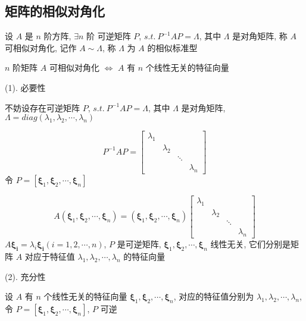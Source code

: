 \subsection{矩阵的相似对角化}

\begin{definition}[相似对角化]
	设 $A$ 是 $n$ 阶方阵, $\exists n$ 阶 可逆矩阵 $P$, $s.t.\ P^{-1}AP = \varLambda$, 其中 $\varLambda$ 是对角矩阵, 称 $A$ 可相似对角化,
	记作 $A\sim \varLambda$, 称 $\varLambda$ 为 $A$ 的相似标准型
\end{definition}

\begin{theorem}[相似对角化充要条件]
	$n$ 阶矩阵 $A$ 可相似对角化 $\Leftrightarrow$ $A$ 有 $n$ 个线性无关的特征向量

	(1). 必要性
	
	不妨设存在可逆矩阵 $P$, $s.t.\ P^{-1}AP=\varLambda$, 其中 $\varLambda$ 是对角矩阵, $\varLambda = diag(\lambda_{1},\lambda_{2},\cdots,\lambda_{n})$

	$$P^{-1}AP = 
	\begin{bmatrix}
		\lambda_{1} &             &        &           \\
		            & \lambda_{2} &        &           \\
		            &             & \ddots &           \\
		            &             &        & \lambda_{n}
	\end{bmatrix}$$
	令 $P=[\boldsymbol{\xi}_{1}, \boldsymbol{\xi}_{2},\cdots,\boldsymbol{\xi}_{n}]$
	
	$$A(\boldsymbol{\xi}_{1}, \boldsymbol{\xi}_{2},\cdots,\boldsymbol{\xi}_{n}) = (\boldsymbol{\xi}_{1}, \boldsymbol{\xi}_{2},\cdots,\boldsymbol{\xi}_{n})
	\begin{bmatrix}
		\lambda_{1} &             &        &           \\
		            & \lambda_{2} &        &           \\
		            &             & \ddots &           \\
		            &             &        & \lambda_{n}
	\end{bmatrix}$$
	$A\boldsymbol{\xi_{i}} = \lambda_{i}\boldsymbol{\xi_{i}}(i = 1,2,\cdots,n)$, $P$ 是可逆矩阵, 
	$\boldsymbol{\xi}_{1}, \boldsymbol{\xi}_{2},\cdots,\boldsymbol{\xi}_{n}$ 线性无关, 它们分别是矩阵 $A$ 对应于特征值 $\lambda_{1},\lambda_{2},\cdots,\lambda_{n}$ 的特征向量

	(2). 充分性

	设 $A$ 有 $n$ 个线性无关的特征向量 $\boldsymbol{\xi}_{1}, \boldsymbol{\xi}_{2},\cdots,\boldsymbol{\xi}_{n}$,
	对应的特征值分别为 $\lambda_{1}, \lambda_{2},\cdots,\lambda_{n}$, 令 $P=[\boldsymbol{\xi}_{1}, \boldsymbol{\xi}_{2},\cdots,\boldsymbol{\xi}_{n}]$, $P$ 可逆


\end{theorem}

